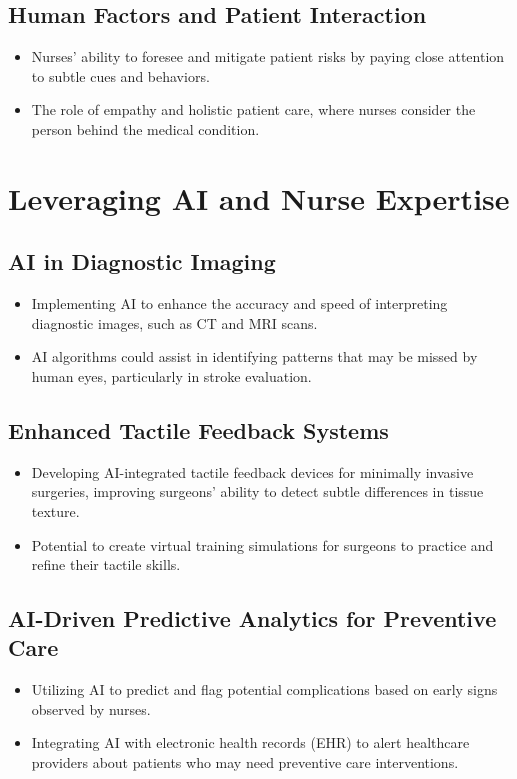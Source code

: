\documentclass{article}
\begin{document}
\subsection*{Human Factors and Patient Interaction}
\begin{itemize}
    \item Nurses' ability to foresee and mitigate patient risks by paying close attention to subtle cues and behaviors.
    \item The role of empathy and holistic patient care, where nurses consider the person behind the medical condition.
\end{itemize}

\section*{Leveraging AI and Nurse Expertise}

\subsection*{AI in Diagnostic Imaging}
\begin{itemize}
    \item Implementing AI to enhance the accuracy and speed of interpreting diagnostic images, such as CT and MRI scans.
    \item AI algorithms could assist in identifying patterns that may be missed by human eyes, particularly in stroke evaluation.
\end{itemize}

\subsection*{Enhanced Tactile Feedback Systems}
\begin{itemize}
    \item Developing AI-integrated tactile feedback devices for minimally invasive surgeries, improving surgeons' ability to detect subtle differences in tissue texture.
    \item Potential to create virtual training simulations for surgeons to practice and refine their tactile skills.
\end{itemize}

\subsection*{AI-Driven Predictive Analytics for Preventive Care}
\begin{itemize}
    \item Utilizing AI to predict and flag potential complications based on early signs observed by nurses.
    \item Integrating AI with electronic health records (EHR) to alert healthcare providers about patients who may need preventive care interventions.
\end{itemize}
\end{document}
